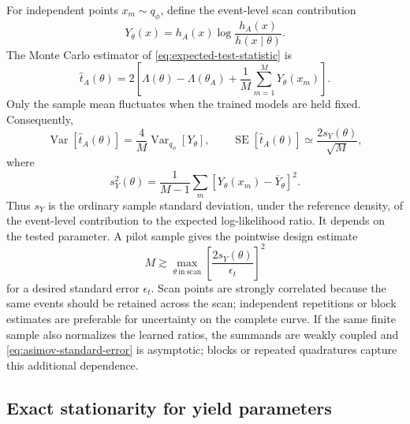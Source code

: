 \documentclass[
  aps,
  prd,
  superscriptaddress,
  nofootinbib,
  longbibliography,
  12pt
]{revtex4-2}
\newcommand{\Var}{\operatorname{Var}}
\newcommand{\SE}{\operatorname{SE}}
\newcommand{\qRef}{q_{\phi}}
\begin{document}
For independent points $x_m\sim\qRef$, define the event-level scan contribution
\begin{equation}
  Y_\theta(x)
  =h_A(x)\log\frac{h_A(x)}{h(x\mid\theta)}.
  \label{eq:Y-definition}
\end{equation}
The Monte Carlo estimator of \cref{eq:expected-test-statistic} is
\begin{equation}
  \widehat t_A(\theta)
  =2\left[\Lambda(\theta)-\Lambda(\theta_A)
  +\frac1M\sum_{m=1}^{M}Y_\theta(x_m)\right].
  \label{eq:asimov-mc-estimator}
\end{equation}
Only the sample mean fluctuates when the trained models are held fixed.  Consequently,
\begin{equation}
  \Var\!\left[\widehat t_A(\theta)\right]
  =\frac{4}{M}\Var_{\qRef}[Y_\theta],
  \qquad
  \SE[\widehat t_A(\theta)]
  \simeq\frac{2s_Y(\theta)}{\sqrt M},
  \label{eq:asimov-standard-error}
\end{equation}
where
\begin{equation}
  s_Y^2(\theta)=\frac{1}{M-1}
  \sum_m\left[Y_\theta(x_m)-\overline Y_\theta\right]^2.
  \label{eq:sY-definition}
\end{equation}
Thus $s_Y$ is the ordinary sample standard deviation, under the reference density, of the event-level contribution to the expected log-likelihood ratio.  It depends on the tested parameter.  A pilot sample gives the pointwise design estimate
\begin{equation}
  M\gtrsim
  \max_{\theta\ \mathrm{in\ scan}}
  \left[\frac{2s_Y(\theta)}{\epsilon_t}\right]^2
  \label{eq:required-asimov-size}
\end{equation}
for a desired standard error $\epsilon_t$.  Scan points are strongly correlated because the same events should be retained across the scan; independent repetitions or block estimates are preferable for uncertainty on the complete curve.  If the same finite sample also normalizes the learned ratios, the summands are weakly coupled and \cref{eq:asimov-standard-error} is asymptotic; blocks or repeated quadratures capture this additional dependence.

\subsection{Exact stationarity for yield parameters}
\label{sec:asimov-stationarity}
\end{document}
